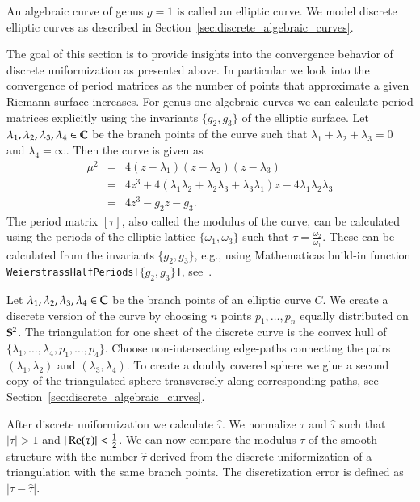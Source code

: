 \documentclass[Thesis]{subfiles}
\begin{document}
An algebraic curve of genus $g=1$ is called an elliptic curve. We model discrete elliptic curves as described in Section~\ref{sec:discrete_algebraic_curves}.

The goal of this section is to provide insights into the convergence behavior of discrete uniformization as presented above. In particular we look into the convergence of period matrices as the number of points that approximate a given Riemann surface increases. For genus one algebraic curves we can calculate period matrices explicitly using the invariants $\{g_2,g_3\}$ of the elliptic surface. Let $\lambda_1,\lambda_2,\lambda_3,\lambda_4\in\C$ be the branch points of the curve such that $\lambda_1+\lambda_2+\lambda_3=0$ and $\lambda_4=\infty$. Then the curve is given as
\begin{eqnarray*}
\mu^2&=&4(z-\lambda_1)(z-\lambda_2)(z-\lambda_3)\\
&=&4z^3+4(\lambda_1\lambda_2+\lambda_2\lambda_3+\lambda_3\lambda_1)z - 4\lambda_1\lambda_2\lambda_3\\
&=&4z^3-g_2z-g_3.
\end{eqnarray*}
The period matrix $[\tau]$, also called the modulus of the curve, can be calculated using the periods of the elliptic lattice $\{\omega_1,\omega_3\}$ such that $\tau = \frac{\omega_2}{\omega_1}$. These can be calculated from the invariants $\{g_2,g_3\}$, e.g., using {\sc Mathematica}s build-in function {\tt WeierstrassHalfPeriods[$\{g_2,g_3\}$]}, see~\cite{WeierstrassHalfPeriods_website}.

Let $\lambda_1, \lambda_2, \lambda_3, \lambda_4 \in \C$ be the branch points of an elliptic curve $C$. We create a discrete version of the curve by choosing $n$ points $p_1,\ldots,p_n$ equally distributed on $\S^2$. The triangulation for one sheet of the discrete curve is the convex hull of $\{\lambda_1,\ldots,\lambda_4,p_1,\ldots, p_4\}$. Choose non-intersecting edge-paths connecting the pairs $(\lambda_1,\lambda_2)$ and $(\lambda_3,\lambda_4)$. To create a doubly covered sphere we glue a second copy of the triangulated sphere transversely along corresponding paths, see Section~\ref{sec:discrete_algebraic_curves}.

After discrete uniformization we calculate $\hat \tau$. We normalize $\tau$ and $\hat \tau$ such that $|\tau|>1$ and $|\re(\tau)| < \frac{1}{2}$. We can now compare the modulus $\tau$ of the smooth structure with the number $\hat \tau$ derived from the discrete uniformization of a triangulation with the same branch points. The discretization error is defined as $|\tau-\hat \tau|$.
\end{document}
